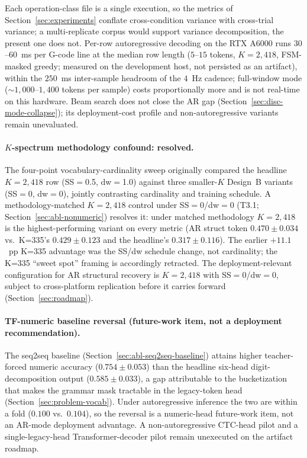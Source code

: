 \documentclass[sensors,article,submit,moreauthors,pdftex]{Definitions/mdpi}
\begin{document}
Each operation-class file is a single execution, so the metrics of Section~\ref{sec:experiments} conflate cross-condition variance with cross-trial variance; a multi-replicate corpus would support variance decomposition, the present one does not. Per-row autoregressive decoding on the RTX A6000 runs $30$--$60$~ms per G-code line at the median row length ($5$--$15$ tokens, $K\!=\!2{,}418$, FSM-masked greedy; measured on the development host, not persisted as an artifact), within the $250$~ms inter-sample headroom of the $4$~Hz cadence; full-window mode ($\sim$$1{,}000$--$1{,}400$ tokens per sample) costs proportionally more and is not real-time on this hardware. Beam search does not close the AR gap (Section~\ref{sec:disc-mode-collapse}); its deployment-cost profile and non-autoregressive variants remain unevaluated.

\paragraph{$K$-spectrum methodology confound: resolved.} The four-point vocabulary-cardinality sweep originally compared the headline $K\!=\!2{,}418$ row (SS$=$0.5, dw$=$1.0) against three smaller-$K$ Design~B variants (SS$=$0, dw$=$0), jointly contrasting cardinality and training schedule. A methodology-matched $K\!=\!2{,}418$ control under SS$=$0/dw$=$0 (T3.1; Section~\ref{sec:abl-nonumeric}) resolves it: under matched methodology $K\!=\!2{,}418$ is the highest-performing variant on every metric (AR struct token $0.470 \pm 0.034$ vs.\ K=335's $0.429 \pm 0.123$ and the headline's $0.317 \pm 0.116$). The earlier $+11.1$~pp K=335 advantage was the SS/dw schedule change, not cardinality; the K=335 ``sweet spot'' framing is accordingly retracted. The deployment-relevant configuration for AR structural recovery is $K\!=\!2{,}418$ with SS$=$0/dw$=$0, subject to cross-platform replication before it carries forward (Section~\ref{sec:roadmap}).

\paragraph{TF-numeric baseline reversal (future-work item, not a deployment recommendation).} The seq2seq baseline (Section~\ref{sec:abl-seq2seq-baseline}) attains higher teacher-forced numeric accuracy ($0.754 \pm 0.053$) than the headline six-head digit-decomposition output ($0.585 \pm 0.033$), a gap attributable to the bucketization that makes the grammar mask tractable in the legacy-token head (Section~\ref{sec:problem-vocab}). Under autoregressive inference the two are within a fold ($0.100$ vs.\ $0.104$), so the reversal is a numeric-head future-work item, not an AR-mode deployment advantage. A non-autoregressive CTC-head pilot and a single-legacy-head Transformer-decoder pilot remain unexecuted on the artifact roadmap.
\end{document}
